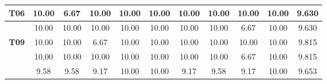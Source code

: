 \begin{table}[htbp]
\begin{tabular}{c|cccccccccc|}
		\multicolumn{1}{|c|}{\textbf{T06}} & \multicolumn{1}{c|}{10.00} & \multicolumn{1}{c|}{6.67} & \multicolumn{1}{c|}{10.00} & \multicolumn{1}{c|}{10.00} & \multicolumn{1}{c|}{10.00} & \multicolumn{1}{c|}{10.00} & \multicolumn{1}{c|}{10.00} & \multicolumn{1}{c|}{10.00} & \multicolumn{1}{c|}{10.00} & 9.630 \\ \hline
		\rowcolor[HTML]{F2F2F2} 
		\multicolumn{1}{|c|}{\cellcolor[HTML]{F2F2F2}\textbf{T08}} & \multicolumn{1}{c|}{\cellcolor[HTML]{F2F2F2}10.00} & \multicolumn{1}{c|}{\cellcolor[HTML]{F2F2F2}10.00} & \multicolumn{1}{c|}{\cellcolor[HTML]{F2F2F2}10.00} & \multicolumn{1}{c|}{\cellcolor[HTML]{F2F2F2}10.00} & \multicolumn{1}{c|}{\cellcolor[HTML]{F2F2F2}10.00} & \multicolumn{1}{c|}{\cellcolor[HTML]{F2F2F2}10.00} & \multicolumn{1}{c|}{\cellcolor[HTML]{F2F2F2}10.00} & \multicolumn{1}{c|}{\cellcolor[HTML]{F2F2F2}6.67} & \multicolumn{1}{c|}{\cellcolor[HTML]{F2F2F2}10.00} & 9.630 \\ \hline
		\multicolumn{1}{|c|}{\textbf{T09}} & \multicolumn{1}{c|}{10.00} & \multicolumn{1}{c|}{10.00} & \multicolumn{1}{c|}{6.67} & \multicolumn{1}{c|}{10.00} & \multicolumn{1}{c|}{10.00} & \multicolumn{1}{c|}{10.00} & \multicolumn{1}{c|}{10.00} & \multicolumn{1}{c|}{10.00} & \multicolumn{1}{c|}{10.00} & 9.815 \\ \hline
		\rowcolor[HTML]{F2F2F2} 
		\multicolumn{1}{|c|}{\cellcolor[HTML]{F2F2F2}\textbf{T10}} & \multicolumn{1}{c|}{\cellcolor[HTML]{F2F2F2}10.00} & \multicolumn{1}{c|}{\cellcolor[HTML]{F2F2F2}10.00} & \multicolumn{1}{c|}{\cellcolor[HTML]{F2F2F2}10.00} & \multicolumn{1}{c|}{\cellcolor[HTML]{F2F2F2}10.00} & \multicolumn{1}{c|}{\cellcolor[HTML]{F2F2F2}10.00} & \multicolumn{1}{c|}{\cellcolor[HTML]{F2F2F2}10.00} & \multicolumn{1}{c|}{\cellcolor[HTML]{F2F2F2}10.00} & \multicolumn{1}{c|}{\cellcolor[HTML]{F2F2F2}6.67} & \multicolumn{1}{c|}{\cellcolor[HTML]{F2F2F2}10.00} & 9.815 \\ \hline
		\rowcolor[HTML]{D0CECE} 
		\multicolumn{1}{|c|}{\cellcolor[HTML]{D0CECE}\textbf{Média}} & \multicolumn{1}{c|}{\cellcolor[HTML]{D0CECE}9.58} & \multicolumn{1}{c|}{\cellcolor[HTML]{D0CECE}9.58} & \multicolumn{1}{c|}{\cellcolor[HTML]{D0CECE}9.17} & \multicolumn{1}{c|}{\cellcolor[HTML]{D0CECE}10.00} & \multicolumn{1}{c|}{\cellcolor[HTML]{D0CECE}10.00} & \multicolumn{1}{c|}{\cellcolor[HTML]{D0CECE}9.17} & \multicolumn{1}{c|}{\cellcolor[HTML]{D0CECE}9.58} & \multicolumn{1}{c|}{\cellcolor[HTML]{D0CECE}9.17} & \multicolumn{1}{c|}{\cellcolor[HTML]{D0CECE}10.00} & 9.653 \\ \hline
	\end{tabular}
	\label{tab:F3_A2_NT_CASO_PROPORCIONAL_}
\end{table}

